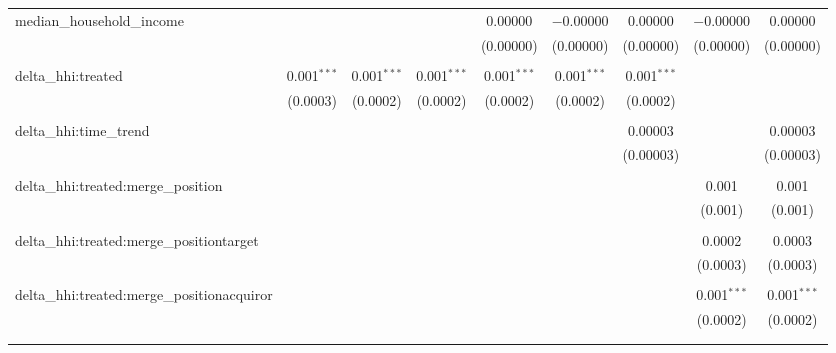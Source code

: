 \begin{table}[H]
{\begin{tabular}{@{\extracolsep{5pt}}lcccccccc}
  median\_household\_income &  &  &  & 0.00000 & $-$0.00000 & 0.00000 & $-$0.00000 & 0.00000 \\  

   &  &  &  & (0.00000) & (0.00000) & (0.00000) & (0.00000) & (0.00000) \\  

   & & & & & & & & \\  

  delta\_hhi:treated & 0.001$^{***}$ & 0.001$^{***}$ & 0.001$^{***}$ & 0.001$^{***}$ & 0.001$^{***}$ & 0.001$^{***}$ &  &  \\  

   & (0.0003) & (0.0002) & (0.0002) & (0.0002) & (0.0002) & (0.0002) &  &  \\  

   & & & & & & & & \\  

  delta\_hhi:time\_trend &  &  &  &  &  & 0.00003 &  & 0.00003 \\  

   &  &  &  &  &  & (0.00003) &  & (0.00003) \\  

   & & & & & & & & \\  

  delta\_hhi:treated:merge\_position &  &  &  &  &  &  & 0.001 & 0.001 \\  

   &  &  &  &  &  &  & (0.001) & (0.001) \\  

   & & & & & & & & \\  

  delta\_hhi:treated:merge\_positiontarget &  &  &  &  &  &  & 0.0002 & 0.0003 \\  

   &  &  &  &  &  &  & (0.0003) & (0.0003) \\  

   & & & & & & & & \\  

  delta\_hhi:treated:merge\_positionacquiror &  &  &  &  &  &  & 0.001$^{***}$ & 0.001$^{***}$ \\  

   &  &  &  &  &  &  & (0.0002) & (0.0002) \\  

   & & & & & & & & \\  

 \hline \\[-1.8ex]  


\end{tabular}}
\end{table}
